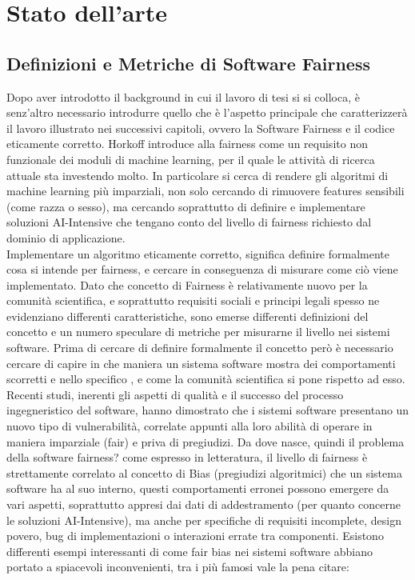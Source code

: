 

\chapter{Stato dell'arte} %


\section{Definizioni e Metriche di Software Fairness}
Dopo aver introdotto il background in cui il lavoro di tesi si si colloca, è senz'altro necessario introdurre quello che è l'aspetto principale che caratterizzerà il lavoro illustrato nei successivi capitoli, ovvero la Software Fairness e il codice eticamente corretto. Horkoff introduce alla fairness come un requisito non funzionale dei moduli di machine learning, per il quale  le attività di ricerca attuale sta investendo molto. In particolare si cerca di rendere gli algoritmi di machine learning più imparziali, non solo cercando di rimuovere features sensibili (come razza o sesso), ma cercando soprattutto di definire e implementare soluzioni AI-Intensive che tengano conto del livello di fairness richiesto dal dominio di applicazione\cite{NFRForML}.\\

Implementare un algoritmo eticamente corretto, significa definire formalmente cosa si intende per fairness, e cercare in conseguenza di misurare come ciò  viene implementato\cite{NFRForML}. Dato che concetto di Fairness è relativamente nuovo per la comunità scientifica, e soprattutto requisiti sociali e principi legali spesso ne evidenziano differenti caratteristiche,  sono emerse differenti definizioni del concetto e un numero speculare di metriche per misurarne il livello nei sistemi software\cite{evalFairClassification}. Prima di cercare di definire formalmente il concetto però è necessario cercare di capire in che maniera un sistema software mostra dei comportamenti scorretti e nello specifico , e come la comunità scientifica si pone rispetto ad esso.   \\

Recenti studi, inerenti gli aspetti di qualità e il successo del processo ingegneristico del software, hanno dimostrato che i sistemi software presentano un nuovo tipo di vulnerabilità, correlate appunti alla loro abilità di operare in maniera imparziale (fair) e priva di pregiudizi. Da dove nasce, quindi il problema della software fairness? \cite{brun2018software} come espresso in letteratura, il livello di fairness è strettamente correlato al concetto di Bias (pregiudizi algoritmici) che un sistema software ha al suo interno, questi comportamenti erronei possono emergere da vari aspetti, soprattutto appresi dai dati di addestramento (per quanto concerne le soluzioni AI-Intensive), ma anche per specifiche di requisiti incomplete, design povero, bug di implementazioni o interazioni errate tra componenti. Esistono differenti esempi interessanti di come fair bias nei sistemi software abbiano portato a spiacevoli inconvenienti, tra i più famosi vale la pena citare:

